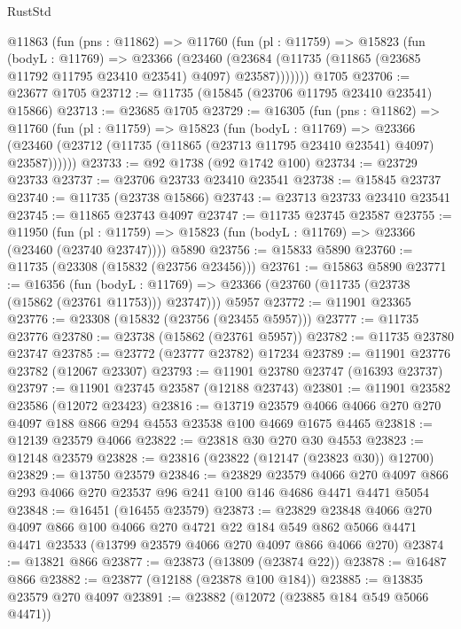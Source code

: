 \begin{lexlean}{RustStd}
\begin{coremodule}
    @11863
      (fun (pns : @11862) =>
      @11760
        (fun (pl : @11759) =>
        @15823
          (fun (bodyL : @11769) =>
          @23366
            (@23460
              (@23684 (@11735 (@11865 (@23685 @11792 @11795 @23410 @23541) @4097) @23587)))))))
    @1705
@23706 := @23677 @1705
@23712 := @11735 (@15845 (@23706 @11795 @23410 @23541) @15866)
@23713 := @23685 @1705
@23729 := @16305
    (fun (pns : @11862) =>
    @11760
      (fun (pl : @11759) =>
      @15823
        (fun (bodyL : @11769) =>
        @23366 (@23460 (@23712 (@11735 (@11865 (@23713 @11795 @23410 @23541) @4097) @23587))))))
@23733 := @92 @1738 (@92 @1742 @100)
@23734 := @23729 @23733
@23737 := @23706 @23733 @23410 @23541
@23738 := @15845 @23737
@23740 := @11735 (@23738 @15866)
@23743 := @23713 @23733 @23410 @23541
@23745 := @11865 @23743 @4097
@23747 := @11735 @23745 @23587
@23755 := @11950
    (fun (pl : @11759) => @15823 (fun (bodyL : @11769) => @23366 (@23460 (@23740 @23747))))
    @5890
@23756 := @15833 @5890
@23760 := @11735 (@23308 (@15832 (@23756 @23456)))
@23761 := @15863 @5890
@23771 := @16356
    (fun (bodyL : @11769) => @23366 (@23760 (@11735 (@23738 (@15862 (@23761 @11753))) @23747)))
    @5957
@23772 := @11901 @23365
@23776 := @23308 (@15832 (@23756 (@23455 @5957)))
@23777 := @11735 @23776
@23780 := @23738 (@15862 (@23761 @5957))
@23782 := @11735 @23780 @23747
@23785 := @23772 (@23777 @23782) @17234
@23789 := @11901 @23776 @23782 (@12067 @23307)
@23793 := @11901 @23780 @23747 (@16393 @23737)
@23797 := @11901 @23745 @23587 (@12188 @23743)
@23801 := @11901 @23582 @23586 (@12072 @23423)
@23816 := @13719
    @23579
    @4066
    @4066
    @270
    @270
    @4097
    @188
    @866
    @294
    @4553
    @23538
    @100
    @4669
    @1675
    @4465
@23818 := @12139 @23579 @4066
@23822 := @23818 @30 @270 @30 @4553
@23823 := @12148 @23579
@23828 := @23816 (@23822 (@12147 (@23823 @30)) @12700)
@23829 := @13750 @23579
@23846 := @23829
    @23579
    @4066
    @270
    @4097
    @866
    @293
    @4066
    @270
    @23537
    @96
    @241
    @100
    @146
    @4686
    @4471
    @4471
    @5054
@23848 := @16451 (@16455 @23579)
@23873 := @23829
    @23848
    @4066
    @270
    @4097
    @866
    @100
    @4066
    @270
    @4721
    @22
    @184
    @549
    @862
    @5066
    @4471
    @4471
    @23533
    (@13799 @23579 @4066 @270 @4097 @866 @4066 @270)
@23874 := @13821 @866
@23877 := @23873 (@13809 (@23874 @22))
@23878 := @16487 @866
@23882 := @23877 (@12188 (@23878 @100 @184))
@23885 := @13835 @23579 @270 @4097
@23891 := @23882 (@12072 (@23885 @184 @549 @5066 @4471))

\end{coremodule}
\end{lexlean}
